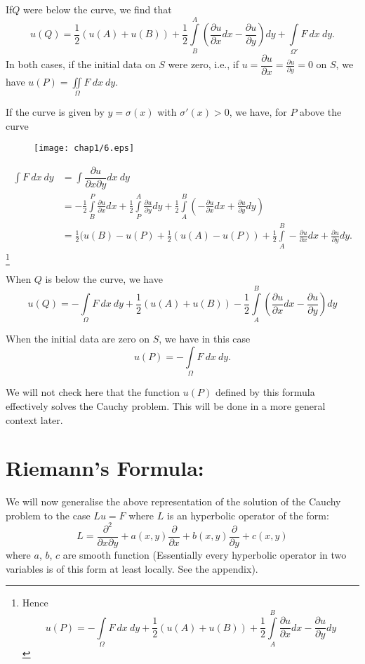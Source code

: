 If\pageoriginale $Q$ were below the curve, we find that
$$
u(Q)=\frac{1}{2}(u(A)+u(B))+\frac{1}{2}\int\limits^{A}_{B}\left(\frac{\partial u}{\partial x}dx-\frac{\partial u}{\partial y}\right)dy+\int\limits_{\Omega'}F \ dx \ dy.
$$
In both cases, if the initial data on $S$ were zero, i.e., if $u=\dfrac{\partial u}{\partial x}=\frac{\partial u}{\partial y}=0$ on $S$, we have $u(P)=\iint\limits_{\Omega}F \ dx \ dy$.

If the curve is given by $y=\sigma(x)$ with $\sigma'(x)>0$, we have, for $P$ above the curve
\begin{figure}[H]
\centering
\texttt{[image: chap1/6.eps]}
\end{figure}
\begin{align*}
\int F \ dx \ dy &= \int \dfrac{\partial u}{\partial x \partial y}dx \ dy\\[3pt]
&= -\frac{1}{2}\int\limits^{P}_{B}\frac{\partial u}{\partial x} dx +\frac{1}{2}\int\limits^{A}_{P}\frac{\partial u}{\partial y}dy + \frac{1}{2}\int\limits^{B}_{A}\left(-\frac{\partial u}{\partial x}dx+\frac{\partial u}{\partial y}dy\right)\\[3pt]
&= \frac{1}{2}(u(B)-u(P)+\frac{1}{2}(u(A)-u(P))+\frac{1}{2}\int\limits^{B}_{A}-\frac{\partial u}{\partial x}dx+\frac{\partial u}{\partial y}dy.
\end{align*}
\footnote[7]{Hence 
$$
u(P)=-\int\limits_{\Omega} F \ dx \ dy +\frac{1}{2}(u(A)+u(B))+\frac{1}{2}\int\limits^{B}_{A}\frac{\partial u}{\partial x}dx-\frac{\partial u}{\partial y}dy
$$}

When $Q$ is below the curve, we have
$$
u(Q)=-\int\limits_{\Omega} F \ dx \ dy +\frac{1}{2}(u(A)+u(B))-\frac{1}{2}\int\limits^{B}_{A}\left(\frac{\partial u}{\partial x}dx-\frac{\partial u}{\partial y}\right)dy
$$

When the initial data are zero on $S$, we have in this case
$$
u(P)=-\int\limits_{\Omega}F \ dx \ dy.
$$

We will not check here that the function $u(P)$ defined by this formula effectively solves the Cauchy problem. This will be done in a more general context later.

\section*{Riemann's Formula:}\pageoriginale

We will now generalise the above representation of the solution of the Cauchy problem to the case $Lu=F$ where $L$ is an hyperbolic operator of the form:
$$
L=\frac{\partial^{2}}{\partial x\partial y}+a(x,y)\frac{\partial}{\partial x}+b(x,y)\frac{\partial}{\partial y}+c(x,y)
$$
where $a$, $b$, $c$ are smooth function (Essentially every hyperbolic operator in two variables is of this form at least locally. See the appendix).

